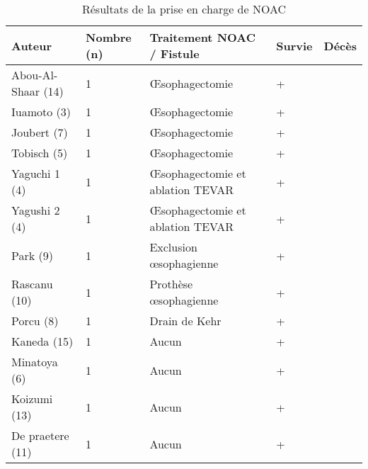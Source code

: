 \begin{table}[!h]
\centering
\begin{tabular}{lllll}
\hline
Auteur             & Nombre (n) & Traitement NOAC / Fistule        & Survie & Décès \\ \hline
Abou-Al-Shaar (14) & 1          & Œsophagectomie                   & +      &       \\
Iuamoto (3)        & 1          & Œsophagectomie                   & +      &       \\
Joubert (7)        & 1          & Œsophagectomie                   & +      &       \\
Tobisch (5)        & 1          & Œsophagectomie                   & +      &       \\
Yaguchi 1 (4)      & 1          & Œsophagectomie et ablation TEVAR & +      &       \\
Yagushi 2 (4)      & 1          & Œsophagectomie et ablation TEVAR & +      &       \\
Park (9)           & 1          & Exclusion œsophagienne           & +      &       \\
Rascanu (10)       & 1          & Prothèse œsophagienne            & +      &       \\
Porcu (8)          & 1          & Drain de Kehr                    & +      &       \\
Kaneda (15)        & 1          & Aucun                            & +      &       \\
Minatoya (6)       & 1          & Aucun                            & +      &       \\
Koizumi (13)       & 1          & Aucun                            & +      &       \\
De praetere (11)   & 1          & Aucun                            & +      &       \\ \hline
\end{tabular}
\caption{Résultats de la prise en charge de NOAC}
\label{tab:resultats}
\end{table}